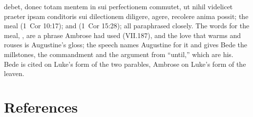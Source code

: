 {{debet, donec totam mentem in sui perfectionem commutet, ut nihil videlicet
praeter ipsam conditoris sui dilectionem diligere, agere, recolere anima
possit}; the meal  (1~Cor 10:17); and  (1~Cor 15:28); all paraphrased closely.
The words for the meal, , are a phrase Ambrose
had used (VII.187), and the love that warms and rouses is Augustine's gloss;
the speech names Augustine for it and gives Bede the millstones, the
commandment and the argument from ``until,'' which are his.
Bede is cited on Luke's form of the two parables, Ambrose on Luke's form of
the leaven.

\par}

\section*{References}

